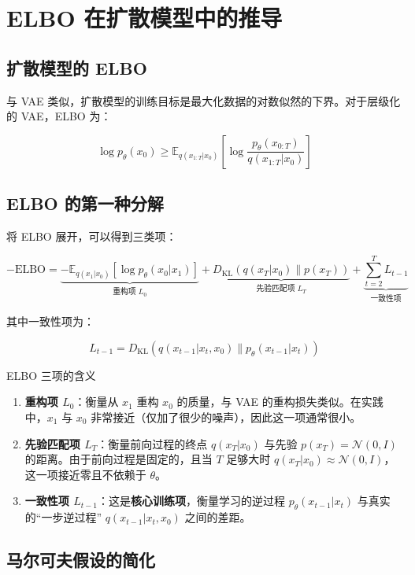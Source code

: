 \section{ELBO 在扩散模型中的推导}

\subsection{扩散模型的 ELBO}

与 VAE 类似，扩散模型的训练目标是最大化数据的对数似然的下界。对于层级化的 VAE，ELBO 为：

$$\log p_\theta(x_0) \geq \mathbb{E}_{q(x_{1:T}|x_0)} \left[ \log \frac{p_\theta(x_{0:T})}{q(x_{1:T}|x_0)} \right]$$

\subsection{ELBO 的第一种分解}

将 ELBO 展开，可以得到三类项：

$$-\text{ELBO} = \underbrace{-\mathbb{E}_{q(x_1|x_0)}[\log p_\theta(x_0|x_1)]}_{\text{重构项 } L_0} + \underbrace{D_{\text{KL}}(q(x_T|x_0) \| p(x_T))}_{\text{先验匹配项 } L_T} + \underbrace{\sum_{t=2}^{T} L_{t-1}}_{\text{一致性项}}$$

其中一致性项为：

$$L_{t-1} = D_{\text{KL}}(q(x_{t-1}|x_t, x_0) \| p_\theta(x_{t-1}|x_t))$$

\begin{importantbox}{ELBO 三项的含义}
\begin{enumerate}
    \item \textbf{重构项 $L_0$}：衡量从 $x_1$ 重构 $x_0$ 的质量，与 VAE 的重构损失类似。在实践中，$x_1$ 与 $x_0$ 非常接近（仅加了很少的噪声），因此这一项通常很小。
    \item \textbf{先验匹配项 $L_T$}：衡量前向过程的终点 $q(x_T|x_0)$ 与先验 $p(x_T) = \mathcal{N}(0, I)$ 的距离。由于前向过程是固定的，且当 $T$ 足够大时 $q(x_T|x_0) \approx \mathcal{N}(0,I)$，这一项接近零且不依赖于 $\theta$。
    \item \textbf{一致性项 $L_{t-1}$}：这是\textbf{核心训练项}，衡量学习的逆过程 $p_\theta(x_{t-1}|x_t)$ 与真实的``一步逆过程'' $q(x_{t-1}|x_t, x_0)$ 之间的差距。
\end{enumerate}
\end{importantbox}

\subsection{马尔可夫假设的简化}

